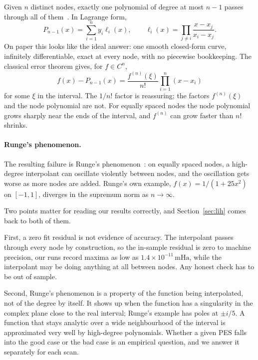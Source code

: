 \documentclass[sigconf,screen,nonacm]{acmart}
\newcommand{\mHa}{\,\text{mHa}}
\begin{document}
Given $n$ distinct nodes, exactly one polynomial of degree at most $n-1$
passes through all of them~\cite{burden,trefethen}. In Lagrange form,
\begin{equation}
P_{n-1}(x) = \sum_{i=1}^{n} y_i \ell_i(x),
\qquad
\ell_i(x) = \prod_{j\neq i}\frac{x-x_j}{x_i-x_j}.
\label{eq:lagrange}
\end{equation}
On paper this looks like the ideal answer: one smooth closed-form curve,
infinitely differentiable, exact at every node, with no piecewise
bookkeeping. The classical error theorem gives, for $f \in C^n$,
\begin{equation}
f(x) - P_{n-1}(x) = \frac{f^{(n)}(\xi)}{n!}\prod_{i=1}^{n}(x - x_i)
\label{eq:polyerror}
\end{equation}
for some $\xi$ in the interval. The $1/n!$ factor is reassuring; the factors
$f^{(n)}(\xi)$ and the node polynomial are not. For equally spaced nodes the
node polynomial grows sharply near the ends of the interval, and $f^{(n)}$
can grow faster than $n!$ shrinks.

\paragraph{Runge's phenomenon.}
The resulting failure is Runge's phenomenon~\cite{runge1901}: on equally
spaced nodes, a high-degree interpolant can oscillate violently between
nodes, and the oscillation gets worse as more nodes are added. Runge's own
example, $f(x)=1/(1+25x^2)$ on $[-1,1]$, diverges in the supremum norm as
$n\to\infty$.

Two points matter for reading our results correctly, and Section~\ref{sec:lih}
comes back to both of them.

First, a zero fit residual is not evidence of accuracy. The interpolant
passes through every node by construction, so the in-sample residual is zero
to machine precision, our runs record maxima as low as $1.4\times
10^{-11}\mHa$, while the interpolant may be doing anything at all between
nodes. Any honest check has to be out of sample.

Second, Runge's phenomenon is a property of the function being interpolated,
not of the degree by itself. It shows up when the function has a
singularity in the complex plane close to the real interval; Runge's example
has poles at $\pm i/5$. A function that stays analytic over a wide
neighbourhood of the interval is approximated very well by high-degree
polynomials. Whether a given PES falls into the good case or the bad case is
an empirical question, and we answer it separately for each scan.
\end{document}
